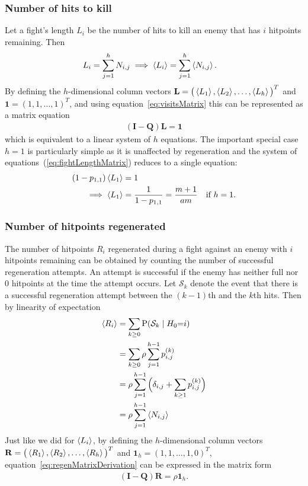 \subsubsection{Number of hits to kill}\label{chap:fightLength}
Let a fight's length $L_i$ be the number of hits to kill an enemy that has $i$ hitpoints remaining. Then
\begin{align}
	L_i &= \sum_{j=1}^h N_{i,j}
	\implies \left\langle L_i \right\rangle = \sum_{j=1}^h \left\langle N_{i,j} \right\rangle.
\end{align}
By defining the $h$-dimensional column vectors $\mathbf{L} = {\big(\left\langle L_1 \right\rangle,\left\langle L_2 \right\rangle,\ldots,\left\langle L_h \right\rangle\big)}^T$ and $\mathbf{1} = {(1,1,\ldots,1)}^T$, and using equation~\ref{eq:visitsMatrix} this can be represented as a matrix equation
\begin{gather}
	(\mathbf{I} - \mathbf{Q})\mathbf{L} = \mathbf{1}\label{eq:fightLengthMatrix}
\end{gather}
which is equivalent to a linear system of $h$ equations. The important special case $h=1$ is particularly simple as it is unaffected by regeneration and the system of equations~(\ref{eq:fightLengthMatrix}) reduces to a single equation:
\begin{align}
	(1 - p_{1,1})\left\langle L_1 \right\rangle &= 1\nonumber\\
	\implies \left\langle L_1 \right\rangle &= \frac{1}{1 - p_{1,1}}
		= \frac{m+1}{am} \quad\mbox{if }h=1.\label{eq:L1}
\end{align}

\subsubsection{Number of hitpoints regenerated}
The number of hitpoints $R_i$ regenerated during a fight against an enemy with $i$ hitpoints remaining can be obtained by counting the number of successful regeneration attempts. An attempt is successful if the enemy has neither full nor 0 hitpoints at the time the attempt occurs. Let $\mathcal{S}_k$ denote the event that there is a successful regeneration attempt between the $(k-1)$th and the $k$th hits. Then by linearity of expectation
\begin{align}
	\E{R_i}
		&= \sum_{k\geq 0} \Pr{\mathcal{S}_k \mid H_0=i}\nonumber\\
		&= \sum_{k\geq 0} \rho\sum_{j=1}^{h-1} p_{i,j}^{(k)}\nonumber\\
		&= \rho\sum_{j=1}^{h-1}\Big(\delta_{i,j} + \sum_{k\geq 1} p_{i,j}^{(k)}\Big)\nonumber\\
		&= \rho\sum_{j=1}^{h-1}\E{N_{i,j}}\label{eq:regenMatrixDerivation}
\end{align}
Just like we did for $\left\langle L_i \right\rangle$, by defining the $h$-dimensional column vectors $\mathbf{R} = {\big(\left\langle R_1 \right\rangle, \left\langle R_2 \right\rangle, \ldots, \left\langle R_h \right\rangle\big)}^T$ and $\mathbf{1}_h = {(1,1,\ldots,1,0)}^T$, equation~\ref{eq:regenMatrixDerivation} can be expressed in the matrix form
\begin{gather}\label{eq:regenMatrix}
	(\mathbf{I} - \mathbf{Q})\mathbf{R} = \rho\mathbf{1}_h.
\end{gather}

